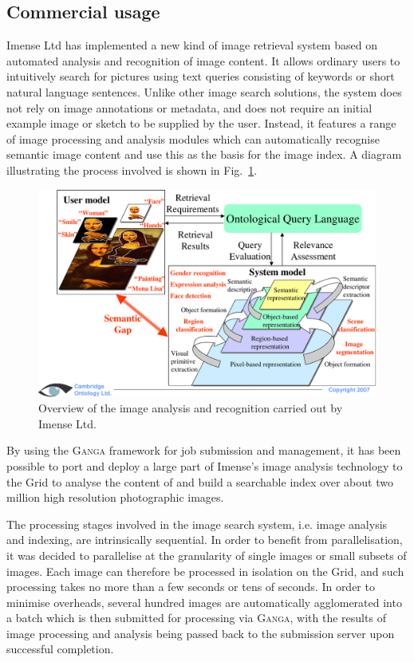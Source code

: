 \documentclass{elsart}
\def\ganga {\textsc{Ganga}\xspace}
\def\grid {Grid\xspace}
\begin{document}
\subsection{Commercial usage}
\label{sec:Imense}
Imense Ltd has implemented a new kind of image retrieval system based on
automated analysis and recognition of image content. It allows ordinary users
to intuitively search for pictures using text queries consisting of keywords
or short natural language sentences. Unlike other image search solutions, the
system does not rely on image annotations or metadata, and does not require an
initial example image or sketch to be supplied by the user. Instead, it
features a range of image processing and analysis modules which can
automatically recognise semantic image content and use this as the basis for
the image index. A diagram illustrating the process involved is shown in
Fig.~\ref{fig:camtologytech}.
\begin{figure}[htb]
  \begin{center}
    \includegraphics[width=0.85 \textwidth]{camtologyfigure.pdf}
  \end{center}
  \caption{Overview of the image analysis and recognition carried
    out by Imense Ltd.}
  \label{fig:camtologytech}
\end{figure}

By using the \ganga framework for job submission and management, it has been
possible to port and deploy a large part of Imense's image analysis technology
to the \grid to analyse the content of and build a searchable index over about
two million high resolution photographic images.

The processing stages involved in the image search system, i.e. image analysis
and indexing, are intrinsically sequential. In order to benefit from
parallelisation, it was decided to parallelise at the granularity of single
images or small subsets of images. Each image can therefore be processed in
isolation on the \grid, and such processing takes no more than a few seconds
or tens of seconds. In order to minimise overheads, several hundred images are
automatically agglomerated into a batch which is then submitted for processing
via \ganga, with the results of image processing and analysis being passed
back to the submission server upon successful completion.
\end{document}
